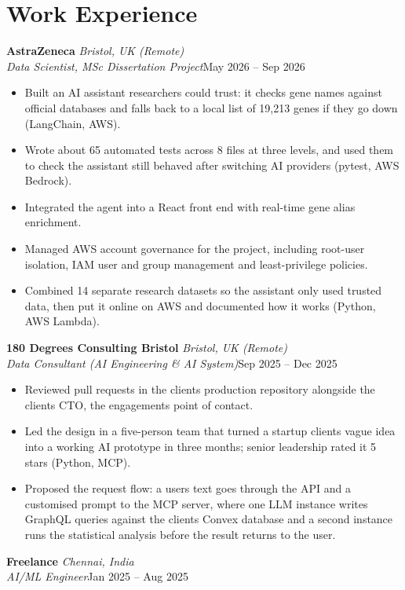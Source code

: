 \documentclass[a4paper,11pt]{article}
\newcommand{\role}[4]{%
  \textbf{#1}{\color{muted}\,\textperiodcentered\,\textit{#2}}\\
  \textit{#4}\hfill{\color{muted}#3}\par}
\newcommand{\gap}{\vspace{5pt}}
\begin{document}
\section{Work Experience}
\role{AstraZeneca}{Bristol, UK (Remote)}{May 2026 – Sep 2026}{Data Scientist, MSc Dissertation Project}
\begin{itemize}
  \item Built an AI assistant researchers could trust: it checks gene names against official databases and falls back to a local list of 19,213 genes if they go down (LangChain, AWS).
  \item Wrote about 65 automated tests across 8 files at three levels, and used them to check the assistant still behaved after switching AI providers (pytest, AWS Bedrock).
  \item Integrated the agent into a React front end with real-time gene alias enrichment.
  \item Managed AWS account governance for the project, including root-user isolation, IAM user and group management and least-privilege policies.
  \item Combined 14 separate research datasets so the assistant only used trusted data, then put it online on AWS and documented how it works (Python, AWS Lambda).
\end{itemize}
\gap
{}
\role{180 Degrees Consulting Bristol}{Bristol, UK (Remote)}{Sep 2025 – Dec 2025}{Data Consultant (AI Engineering \& AI System)}
\begin{itemize}
  \item Reviewed pull requests in the client\textquotesingle{}s production repository alongside the client\textquotesingle{}s CTO, the engagement\textquotesingle{}s point of contact.
  \item Led the design in a five-person team that turned a startup client\textquotesingle{}s vague idea into a working AI prototype in three months; senior leadership rated it 5 stars (Python, MCP).
  \item Proposed the request flow: a user\textquotesingle{}s text goes through the API and a customised prompt to the MCP server, where one LLM instance writes GraphQL queries against the client\textquotesingle{}s Convex database and a second instance runs the statistical analysis before the result returns to the user.
\end{itemize}
\gap
{}
\role{Freelance}{Chennai, India}{Jan 2025 – Aug 2025}{AI/ML Engineer}
\end{document}
